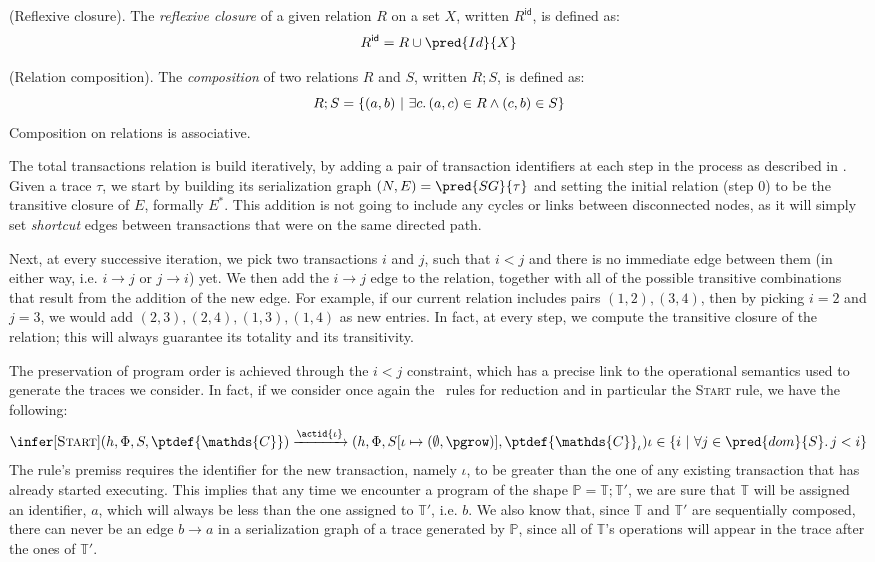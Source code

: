 \begin{defn}
	(Reflexive closure).
	The \emph{reflexive closure} of a given relation $R$ on a set $X$, written $R^\mathsf{id}$, is defined as:
	\[
		R^\mathsf{id} = R \cup \pred{Id}{X}
	\]
\end{defn}

\begin{defn}
	(Relation composition).
	The \emph{composition} of two relations $R$ and $S$, written $R ; S$, is defined as:
	\[
		R ; S = \{ (a, b)\ |\ \exists c \ldotp (a, c) \in R \land (c, b) \in S \}
	\]
	Composition on relations is associative.
\end{defn}

The total transactions relation is build iteratively, by adding a pair of transaction identifiers at each step in the process as described in \cite{ceroneAlgebraic}. Given a trace $\tau$, we start by building its serialization graph $(N, E) = \pred{SG}{\tau}$ and setting the initial relation (step $0$) to be the transitive closure of $E$, formally $E^*$. This addition is not going to include any cycles or links between disconnected nodes, as it will simply set \textit{shortcut} edges between transactions that were on the same directed path.

Next, at every successive iteration, we pick two transactions $i$ and $j$, such that $i < j$ and there is no immediate edge between them (in either way, i.e. $i \rightarrow j$ or $j \rightarrow i$) yet. We then add the $i \rightarrow j$ edge to the relation, together with all of the possible transitive combinations that result from the addition of the new edge. For example, if our current relation includes pairs $(1, 2), (3, 4)$, then by picking $i = 2$ and $j = 3$, we would add $(2, 3), (2, 4), (1, 3), (1, 4)$ as new entries. In fact, at every step, we compute the transitive closure of the relation; this will always guarantee its totality and its transitivity.

The preservation of program order is achieved through the $i < j$ constraint, which has a precise link to the operational semantics used to generate the traces we consider. In fact, if we consider once again the \tpl\ rules for reduction and in particular the \textsc{Start} rule, we have the following:
\[
	\infer[\textsc{Start}]
	{
		(h, \Phi, S, \ptdef{\mathds{C}})
		\xrightarrow{\actid{\iota}}
		(h, \Phi, S[\iota \mapsto (\emptyset, \pgrow)], \ptdef{\mathds{C}}_\iota)
	}
	{
		\iota \in \{ i\ |\ \forall j \in \pred{dom}{S} \ldotp j < i \}
	}
\]
The rule's premiss requires the identifier for the new transaction, namely $\iota$, to be greater than the one of any existing transaction that has already started executing. This implies that any time we encounter a program of the shape $\mathds{P} = \mathds{T} ; \mathds{T}'$, we are sure that $\mathds{T}$ will be assigned an identifier, $a$, which will always be less than the one assigned to $\mathds{T}'$, i.e. $b$. We also know that, since $\mathds{T}$ and $\mathds{T}'$ are sequentially composed, there can never be an edge $b \rightarrow a$ in a serialization graph of a trace generated by $\mathds{P}$, since all of $\mathds{T}$'s operations will appear in the trace after the ones of $\mathds{T}'$.


